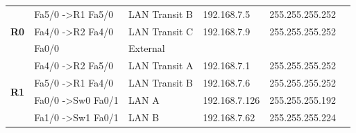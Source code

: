 \documentclass[11pt,a4paper]{report}
\begin{document}
\begin{table}[]
\begin{center}
\begin{tabular}{@{}llllll@{}}
\multirow{3}{*}{\textbf{R0}}                       & Fa5/0 -\textgreater R1 Fa5/0                             & LAN Transit B                                         & 192.168.7.5                                      & 255.255.255.252                                           &                                                       \\ \cmidrule(l){2-6}
                                                   & Fa4/0 -\textgreater R2   Fa4/0                           & LAN Transit C                                         & 192.168.7.9                                      & 255.255.255.252                                           &                                                       \\ \cmidrule(l){2-6}
                                                   & Fa0/0                                                    & External                                              &                                                  &                                                           &                                                       \\ \midrule
\multirow{4}{*}{\textbf{R1}}                       & Fa4/0 -\textgreater R2 Fa5/0                             & LAN Transit A                                         & 192.168.7.1                                      & 255.255.255.252                                           &                                                       \\ \cmidrule(l){2-6}
                                                   & Fa5/0 -\textgreater R1   Fa4/0                           & LAN Transit B                                         & 192.168.7.6                                      & 255.255.255.252                                           &                                                       \\ \cmidrule(l){2-6}
                                                   & Fa0/0 -\textgreater Sw0 Fa0/1                            & LAN A                                                 & 192.168.7.126                                    & 255.255.255.192                                           &                                                       \\ \cmidrule(l){2-6}
                                                   & Fa1/0 -\textgreater Sw1 Fa0/1                            & LAN B                                                 & 192.168.7.62                                     & 255.255.255.224                                           &                                                       \\ \midrule

\end{tabular}
\end{center}
\end{table}
\end{document}
